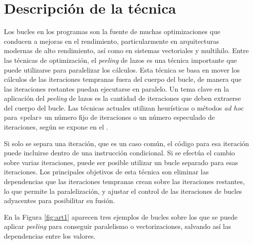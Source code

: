 \documentclass[11pt,a4paper,twoside]{article}
\theoremstyle{definition}
\begin{document}
	\section{Descripción de la técnica}

	Los bucles en los programas son la fuente de muchas optimizaciones que conducen a mejoras en el rendimiento, particularmente en arquitecturas modernas de alto rendimiento, así como en sistemas vectoriales y multihilo. Entre las técnicas de optimización, el \textit{peeling} de lazos es una técnica importante que puede utilizarse para paralelizar los cálculos. Esta técnica se basa en mover los cálculos de las iteraciones tempranas fuera del cuerpo del bucle, de manera que las iteraciones restantes puedan ejecutarse en paralelo. Un tema clave en la aplicación del \textit{peeling} de lazos es la cantidad de iteraciones que deben extraerse del cuerpo del bucle. Las técnicas actuales utilizan heurísticas o métodos \textit{ad hoc} para «pelar» un número fijo de iteraciones o un número especulado de iteraciones, según se expone en el \cite{art}.
	
	Si solo se separa una iteración, que es un caso común, el código para esa iteración puede incluirse dentro de una instrucción condicional. Si se efectúa el cambio sobre varias iteraciones, puede ser posible utilizar un bucle separado para esas iteraciones. Los principales objetivos de esta técnica son eliminar las dependencias que las iteraciones tempranas crean sobre las iteraciones restantes, lo que permite la paralelización, y ajustar el control de las iteraciones de bucles adyacentes para posibilitar su fusión.
	
	En la Figura \ref{fig:art1} aparecen tres ejemplos de bucles sobre los que se puede aplicar \textit{peeling} para conseguir paralelismo o vectorizaciones, salvando así las dependencias entre los valores.
	
\end{document}
